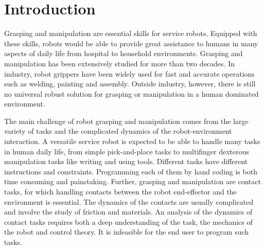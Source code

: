 \chapter{Introduction}
\label{cha1}

\setcounter{page}{1}
Grasping and manipulation are essential skills for service robots. Equipped with these skills, robots would be able to provide great assistance to humans in many aspects of daily life from hospital to household environments. Grasping and manipulation has been extensively studied for more than two decades. In industry, robot grippers have been widely used for fast and accurate operations such as welding, painting and assembly. Outside industry, however, there is still no universal robust solution for grasping or manipulation in a human dominated environment.

The main challenge of robot grasping and manipulation comes from the large variety of tasks and the complicated dynamics of the robot-environment interaction. A versatile service robot is expected to be able to handle many tasks in human daily life, from simple pick-and-place tasks to multifinger dexterous manipulation tasks like writing and using tools. Different tasks have different instructions and constraints. Programming each of them by hand coding is both time consuming and painstaking. Further, grasping and manipulation are contact tasks, for which handling contacts between the robot end-effector and the environment is essential. The dynamics of the contacts are usually complicated and involve the study of friction and materials. An analysis of the dynamics of contact tasks requires both a deep understanding of the task, the mechanics of the robot and control theory. It is infeasible for the end user to program such tasks.

